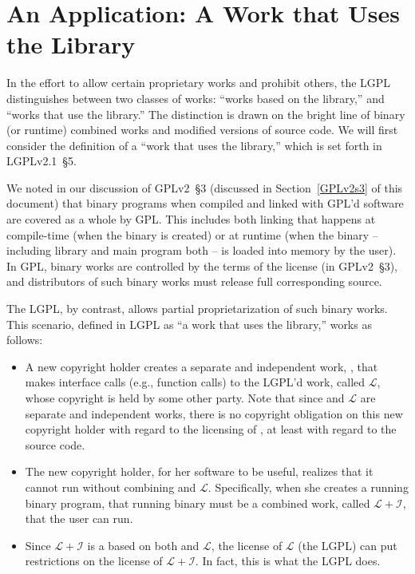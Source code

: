 \section{An Application: A Work that Uses the Library}

In the effort to allow certain proprietary works and prohibit
others, the LGPL distinguishes between two classes of works:
``works based on the library,'' and ``works that use the library.''  The
distinction is drawn on the bright line of binary (or runtime) combined
works and modified versions of source code. We will first consider the definition
of a ``work that uses the library,'' which is set forth in LGPLv2.1~\S5.

We noted in our discussion of GPLv2~\S3 (discussed in
Section~\ref{GPLv2s3} of this document) that binary programs when
compiled and linked with GPL'd software are covered as a whole by GPL\@.
This includes both linking that happens at compile-time (when
the binary is created) or at runtime (when the binary -- including library
and main program both -- is loaded into memory by the user). In GPL,
binary works are controlled by the terms of the license (in GPLv2~\S3),
and distributors of such binary works must release full
corresponding source\@.

The LGPL, by contrast, allows partial proprietarization of such binary works.
This scenario, defined in LGPL as ``a work that uses the library,'' works as
follows:

\newcommand{\workl}{$\mathcal{L}$}
\newcommand{\lplusi}{$\mathcal{L\!\!+\!\!I}$}

\begin{itemize}

\item A new copyright holder creates a separate and independent work,
  \worki{}, that makes interface calls (e.g., function calls) to the
  LGPL'd work, called \workl{}, whose copyright is held by some other
  party. Note that since \worki{} and \workl{} are separate and
  independent works, there is no copyright obligation on this new copyright
  holder with regard to the licensing of \worki{}, at least with regard to
  the source code.

\item The new copyright holder, for her software to be useful, realizes
  that it cannot run without combining \worki{} and \workl{}.
  Specifically, when she creates a running binary program, that running
  binary must be a combined work, called \lplusi{}, that the user can
  run.

\item Since \lplusi{} is a based on both \worki{} and \workl{},
  the license of \workl{} (the LGPL) can put restrictions on the license
  of \lplusi{}. In fact, this is what the LGPL does.

\end{itemize}

